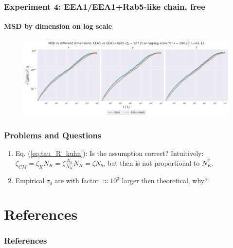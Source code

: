 \documentclass[handout]{beamer}
\begin{document}
\begin{frame}
    \frametitle{Experiment 4: EEA1/EEA1+Rab5-like chain, free}
    \framesubtitle{MSD by dimension on log scale}
    \begin{figure}[h]
        \includegraphics[width=11.2cm]{./17-exp-msd-dim-log.png}
    \end{figure}
\end{frame}

\begin{frame}
    \frametitle{Problems and Questions}
    \begin{enumerate}
        \item Eq. (\ref{eq:tau_R_kuhn}): Is the assumption correct? 
        Intuitively: $\zeta_{CM}=\zeta_K N_K=\zeta \frac{N_b}{N_K} N_K=\zeta N_b$, but then
        \cite[Eq. 15]{svaneborg_2020} is not proportional to $N_K^2$.
        \item Empirical $\tau_0$ are with factor $\approx 10^3$ larger then theoretical, why?
    \end{enumerate}
\end{frame}

\section{References}

\begin{frame}
    \frametitle{References}
    
    
\end{frame}
\end{document}
